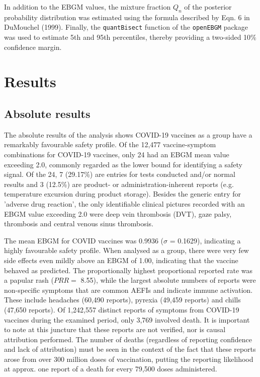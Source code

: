 \documentclass[preprints,communication,submit,oneauthor,pdftex]{Definitions/mdpi}
\begin{document}
In addition to the EBGM values, the mixture fraction $Q_n$ of the posterior probability distribution was estimated using the formula described by Eqn. 6 in DuMouchel (1999).\cite{dumouchel1999bayesian} Finally, the \texttt{quantBisect} function of the \texttt{openEBGM} package was used to estimate 5th and 95th percentiles, thereby providing a two-sided 10\% confidence margin. 


\section{Results} %
\label{sec:results}

\subsection{Absolute results} %
\label{sub:absolute_results}

The absolute results of the analysis shows COVID-19 vaccines as a group have a remarkably favourable safety profile. Of the 12,477 vaccine-symptom combinations for COVID-19 vaccines, only 24 had an EBGM mean value exceeding 2.0, commonly regarded as the lower bound for identifying a safety signal. Of the 24, 7 (29.17\%) are entries for tests conducted and/or normal results and 3 (12.5\%) are product- or administration-inherent reports (e.g. temperature excursion during product storage). Besides the generic entry for 'adverse drug reaction', the only identifiable clinical pictures recorded with an EBGM value exceeding 2.0 were deep vein thrombosis (DVT), gaze palsy, thrombosis and central venous sinus thrombosis.

The mean EBGM for COVID vaccines was 0.9936 ($\sigma$ = 0.1629), indicating a highly favourable safety profile. When analysed as a group, there were very few side effects even mildly above an EBGM of 1.00, indicating that the vaccine behaved as predicted. The proportionally highest proportional reported rate was a papular rash ($PRR =$ 8.55), while the largest absolute numbers of reports were non-specific symptoms that are common AEFIs and indicate immune activation. These include headaches (60,490 reports), pyrexia (49,459 reports) and chills (47,650 reports). Of 1,242,557 distinct reports of symptoms from COVID-19 vaccines during the examined period, only 3,769 involved death. It is important to note at this juncture that these reports are not verified, nor is causal attribution performed. The number of deaths (regardless of reporting confidence and lack of attribution) must be seen in the context of the fact that these reports arose from over 300 million doses of vaccination, putting the reporting likelihood at approx. one report of a death for every 79,500 doses administered.
\end{document}
